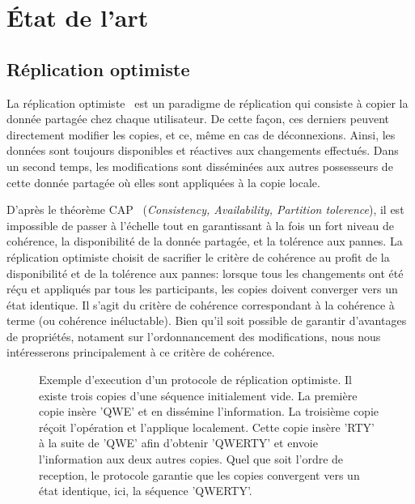 
\section{État de l'art}

\subsection{Réplication optimiste}

La réplication optimiste~\cite{demers1987epidemic, saito2005optimistic} est un
paradigme de réplication qui consiste à copier la donnée partagée chez chaque
utilisateur. De cette façon, ces derniers peuvent directement modifier les
copies, et ce, même en cas de déconnexions.  Ainsi, les données sont toujours
disponibles et réactives aux changements effectués. Dans un second temps, les
modifications sont disséminées aux autres possesseurs de cette donnée partagée
où elles sont appliquées à la copie locale.

D'après le théorème CAP~\cite{gilbert2002brewer} (\emph{Consistency,
  Availability, Partition tolerence}), il est impossible de passer à l'échelle
tout en garantissant à la fois un fort niveau de cohérence, la disponibilité de
la donnée partagée, et la tolérence aux pannes. La réplication optimiste choisit
de sacrifier le critère de cohérence au profit de la disponibilité et de la
tolérence aux pannes: lorsque tous les changements ont été réçu et appliqués par
tous les participants, les copies doivent converger vers un état identique. Il
s'agit du critère de cohérence correspondant à la cohérence à terme (ou
cohérence inéluctable). Bien qu'il soit possible de garantir d'avantages de
propriétés, notament sur l'ordonnancement des modifications, nous nous
intéresserons principalement à ce critère de cohérence.

\begin{figure}
  \centering
  
  \caption{\label{fig:optimisticexample}Exemple d'execution d'un protocole de
    réplication optimiste. Il existe trois copies d'une séquence initialement
    vide. La première copie insère 'QWE' et en dissémine l'information. La
    troisième copie réçoit l'opération et l'applique localement. Cette copie
    insère 'RTY' à la suite de 'QWE' afin d'obtenir 'QWERTY' et envoie
    l'information aux deux autres copies. Quel que soit l'ordre de reception, le
    protocole garantie que les copies convergent vers un état identique, ici, la
    séquence 'QWERTY'.}
\end{figure}

